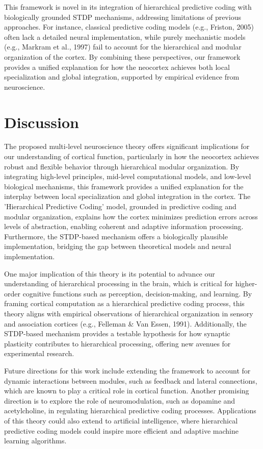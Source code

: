 \documentclass{article}
\begin{document}
This framework is novel in its integration of hierarchical predictive coding with biologically grounded STDP mechanisms, addressing limitations of previous approaches. For instance, classical predictive coding models (e.g., Friston, 2005) often lack a detailed neural implementation, while purely mechanistic models (e.g., Markram et al., 1997) fail to account for the hierarchical and modular organization of the cortex. By combining these perspectives, our framework provides a unified explanation for how the neocortex achieves both local specialization and global integration, supported by empirical evidence from neuroscience.

\section{Discussion}
The proposed multi-level neuroscience theory offers significant implications for our understanding of cortical function, particularly in how the neocortex achieves robust and flexible behavior through hierarchical modular organization. By integrating high-level principles, mid-level computational models, and low-level biological mechanisms, this framework provides a unified explanation for the interplay between local specialization and global integration in the cortex. The 'Hierarchical Predictive Coding' model, grounded in predictive coding and modular organization, explains how the cortex minimizes prediction errors across levels of abstraction, enabling coherent and adaptive information processing. Furthermore, the STDP-based mechanism offers a biologically plausible implementation, bridging the gap between theoretical models and neural implementation.

One major implication of this theory is its potential to advance our understanding of hierarchical processing in the brain, which is critical for higher-order cognitive functions such as perception, decision-making, and learning. By framing cortical computation as a hierarchical predictive coding process, this theory aligns with empirical observations of hierarchical organization in sensory and association cortices (e.g., Felleman & Van Essen, 1991). Additionally, the STDP-based mechanism provides a testable hypothesis for how synaptic plasticity contributes to hierarchical processing, offering new avenues for experimental research.

Future directions for this work include extending the framework to account for dynamic interactions between modules, such as feedback and lateral connections, which are known to play a critical role in cortical function. Another promising direction is to explore the role of neuromodulation, such as dopamine and acetylcholine, in regulating hierarchical predictive coding processes. Applications of this theory could also extend to artificial intelligence, where hierarchical predictive coding models could inspire more efficient and adaptive machine learning algorithms.
\end{document}
